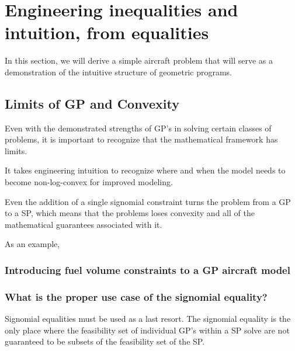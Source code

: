 \chapter{Engineering inequalities and intuition, from equalities}

In this section, we will derive a simple aircraft problem that will serve as a demonstration of the intuitive structure of geometric programs. 

\section{Limits of GP and Convexity} \label{sec:GPLimits}

Even with the demonstrated strengths of \gls{GP}'s in solving certain classes of problems, it is important to recognize that the mathematical framework has limits. 

It takes engineering intuition to recognize where and when the model needs to become non-log-convex for improved modeling. 

Even the addition of a single signomial constraint turns the problem from a \gls{GP} to a \gls{SP}, which means that the problems loses convexity and all of the mathematical guarantees associated with it. 

As an example, 

\subsection{Introducing fuel volume constraints to a GP aircraft model}

\subsection{What is the proper use case of the signomial equality?} 

Signomial equalities must be used as a last resort. The signomial equality is the only place where the feasibility set of individual \gls{GP}'s within a \gls{SP} solve are not guaranteed to be subsets of the feasibility set of the \gls{SP}. 